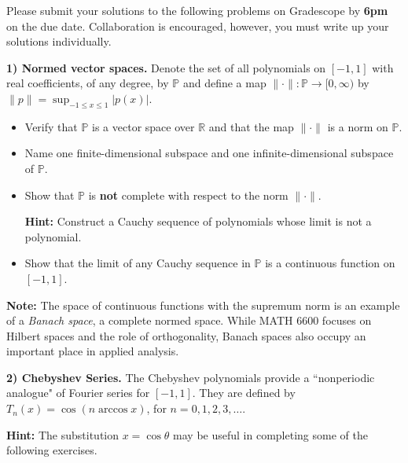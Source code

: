\documentclass[12pt]{article}
\begin{document}
\noindent
Please submit your solutions to the following problems on Gradescope by \textbf{6pm} on the due date. Collaboration is encouraged, however, you must write up your solutions individually.

\bigskip

\noindent
\textbf{1) Normed vector spaces.} Denote the set of all polynomials on $[-1,1]$ with real coefficients, of any degree, by $\mathbb{P}$ and define a map $\|\cdot\|:\mathbb{P}\rightarrow[0,\infty)$ by $\|p\|=\sup_{-1\leq x\leq 1}|p(x)|$.

\begin{itemize}

	\item[\textbf{(a)}] Verify that $\mathbb{P}$ is a vector space over $\mathbb{R}$ and that the map $\|\cdot\|$ is a norm on $\mathbb{P}$.

	\item[\textbf{(b)}] Name one finite-dimensional subspace and one infinite-dimensional subspace of $\mathbb{P}$.

	\item[\textbf{(c)}] Show that $\mathbb{P}$ is \textbf{not} complete with respect to the norm $\|\cdot\|$. 

	\noindent
	\textbf{Hint:} Construct a Cauchy sequence of polynomials whose limit is not a polynomial.

	\item[\textbf{(d)}] Show that the limit of any Cauchy sequence in $\mathbb{P}$ is a continuous function on $[-1,1]$.

\end{itemize}

\noindent
\textbf{Note:} The space of continuous functions with the supremum norm is an example of a \textit{Banach space}, a complete normed space. While MATH 6600 focuses on Hilbert spaces and the role of orthogonality, Banach spaces also occupy an important place in applied analysis.


\bigskip

\noindent
\textbf{2) Chebyshev Series.} The Chebyshev polynomials provide a ``nonperiodic analogue" of Fourier series for $[-1,1]$. They are defined by $T_n(x) = \cos(n\arccos x)$, for $n=0,1,2,3,\ldots$.

\medskip
\noindent
\textbf{Hint:} The substitution $x=\cos\theta$ may be useful in completing some of the following exercises.
\end{document}
